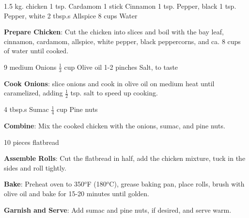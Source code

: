 \documentclass{article}
\begin{document}
\mainmatter



\dishType{\maindish}
\dishOther{\meat}

\begin{step}
1.5 kg. chicken
1 tsp. Cardamom
1 stick Cinnamon
1 tsp. Pepper, black
1 tsp. Pepper, white 
2 tbsp.s Allspice
8 cups Water

\method
\textbf{Prepare Chicken}: Cut the chicken into slices and boil with the bay leaf, cinnamon, cardamom, allspice, white pepper, black peppercorns, and ca. 8 cups of water until cooked.
\end{step}

\begin{step}
9 medium Onions
$\frac{1}{3}$ cup Olive oil
1-2 pinches Salt, to taste

\method
\textbf{Cook Onions}: slice onions and cook in olive oil on medium heat until caramelized, adding $\frac{1}{2}$ tsp. salt to speed up cooking.
\end{step}

\begin{step}
4 tbsp.s Sumac
$\frac{1}{4}$ cup Pine nuts

\method
\textbf{Combine}: Mix the cooked chicken with the onions, sumac, and pine nuts.
\end{step}

\begin{step}
10 pieces flatbread

\method
\textbf{Assemble Rolls}: Cut the flatbread in half, add the chicken mixture, tuck in the sides and roll tightly.

\textbf{Bake}: Preheat oven to 350$^o$F (180$^o$C), grease baking pan, place rolls, brush with olive oil and bake for 15-20 minutes until golden.

\textbf{Garnish and Serve}: Add sumac and pine nuts, if desired, and serve warm.
\end{step}
\end{document}
